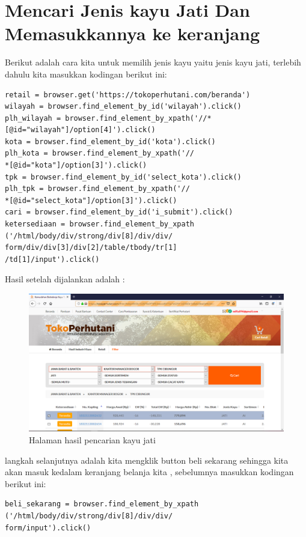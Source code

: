 \newpage 
\section{Mencari Jenis kayu Jati Dan Memasukkannya ke keranjang }
Berikut adalah cara kita untuk memilih jenis kayu yaitu jenis kayu jati, terlebih dahulu kita masukkan kodingan berikut ini: 
\begin{verbatim}
retail = browser.get('https://tokoperhutani.com/beranda')
wilayah = browser.find_element_by_id('wilayah').click()
plh_wilayah = browser.find_element_by_xpath('//*
[@id="wilayah"]/option[4]').click()
kota = browser.find_element_by_id('kota').click()
plh_kota = browser.find_element_by_xpath('//
*[@id="kota"]/option[3]').click()
tpk = browser.find_element_by_id('select_kota').click()
plh_tpk = browser.find_element_by_xpath('//
*[@id="select_kota"]/option[3]').click()
cari = browser.find_element_by_id('i_submit').click()
ketersediaan = browser.find_element_by_xpath
('/html/body/div/strong/div[8]/div/div/
form/div/div[3]/div[2]/table/tbody/tr[1]
/td[1]/input').click()
\end{verbatim}

Hasil setelah dijalankan adalah : 
\begin{figure}[h]
	\centering
	\includegraphics[scale=0.25]{figures/carikayu1}
	\caption{Halaman hasil pencarian kayu jati}
\end{figure}

\newpage
langkah selanjutnya adalah kita mengklik button beli sekarang sehingga kita akan masuk kedalam keranjang belanja kita , sebelumnya masukkan kodingan berikut ini: 
\begin{verbatim}
beli_sekarang = browser.find_element_by_xpath
('/html/body/div/strong/div[8]/div/div/
form/input').click()
\end{verbatim}

